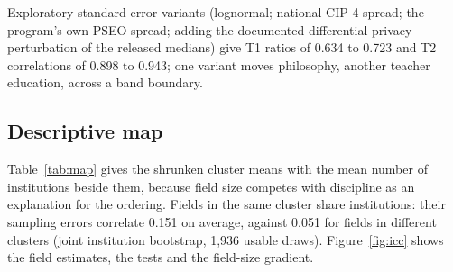 \documentclass[11pt]{article}
\begin{document}
\begin{table}[!tbp]
\smallskip
\begin{minipage}{0.97\textwidth}\footnotesize
Exploratory standard-error variants (lognormal; national CIP-4 spread; the program's own PSEO spread; adding the
documented differential-privacy perturbation of the released medians) give T1 ratios of 0.634 to 0.723 and T2
correlations of 0.898 to 0.943; one variant moves philosophy, another teacher education, across a band boundary.
\end{minipage}
\end{table}

\subsection{Descriptive map}\label{sec:map}

Table~\ref{tab:map} gives the shrunken cluster means with the mean number of institutions beside them, because
field size competes with discipline as an explanation for the ordering. Fields in the same cluster share
institutions: their sampling errors correlate 0.151 on average, against 0.051 for fields in different clusters
(joint institution bootstrap, 1,936 usable draws). Figure~\ref{fig:icc} shows the field estimates, the tests and
the field-size gradient.
\end{document}
